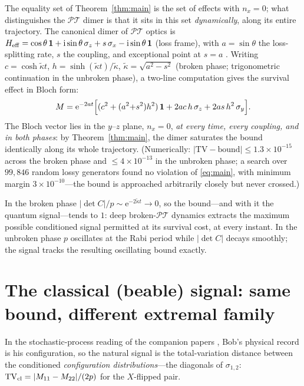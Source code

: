 \documentclass[11pt]{article}
\theoremstyle{remark}
\newcommand{\PT}{\mathcal{PT}}
\newcommand{\ii}{\mathrm{i}}
\newcommand{\ee}{\mathrm{e}}
\newcommand{\TV}{\mathrm{TV}}
\begin{document}
The equality set of Theorem~\ref{thm:main} is the set of effects
with $n_x=0$; what distinguishes the $\PT$ dimer is that it sits in
this set \emph{dynamically}, along its entire trajectory. The
canonical dimer of $\PT$ optics is
$H_{\rm eff}=\cos\theta\,\mathbf 1+\ii\sin\theta\,\sigma_z
+s\,\sigma_x-\ii\sin\theta\,\mathbf 1$ (loss frame), with
$a=\sin\theta$ the loss-splitting rate, $s$ the coupling, and
exceptional point at $s=a$ \cite{indivisible}. Writing
$c=\cosh\tilde\kappa t$,
$h=\sinh(\tilde\kappa t)/\tilde\kappa$,
$\tilde\kappa=\sqrt{a^{2}-s^{2}}$ (broken phase; trigonometric
continuation in the unbroken phase), a two-line computation gives
the survival effect in Bloch form:
\begin{equation}
M=\ee^{-2at}\Bigl[(c^{2}+(a^{2}{+}s^{2})h^{2})\,\mathbf 1
+2ac\,h\,\sigma_z+2as\,h^{2}\,\sigma_y\Bigr].
\label{eq:dimerbloch}
\end{equation}
The Bloch vector lies in the $y$--$z$ plane, $n_x=0$, \emph{at every
time, every coupling, and in both phases}: by
Theorem~\ref{thm:main}, the dimer saturates the bound identically
along its whole trajectory. (Numerically: $|\TV-\text{bound}|\le
1.3\times10^{-15}$ across the broken phase and
$\le4\times10^{-13}$ in the unbroken phase; a search over
$99{,}846$ random lossy generators found no violation of
\eqref{eq:main}, with minimum margin $3\times10^{-10}$---the bound
is approached arbitrarily closely but never crossed.)

In the broken phase $|\det C|/p\sim\ee^{-2\tilde\kappa t}\to0$, so
the bound---and with it the quantum signal---tends to $1$: deep
broken-$\PT$ dynamics extracts the maximum possible conditioned
signal permitted at its survival cost, at every instant. In the
unbroken phase $p$ oscillates at the Rabi period while $|\det C|$
decays smoothly; the signal tracks the resulting oscillating bound
exactly.

\section{The classical (beable) signal: same bound, different
extremal family}
\label{sec:classical}

In the stochastic-process reading of the companion papers
\cite{indivisible,instantaneous}, Bob's physical record is his
configuration, so the natural signal is the total-variation distance
between the conditioned \emph{configuration distributions}---the
diagonals of $\sigma_{1,2}$:
$\TV_{\rm cl}=|M_{11}-M_{22}|/(2p)$ for the $X$-flipped pair.
\end{document}
